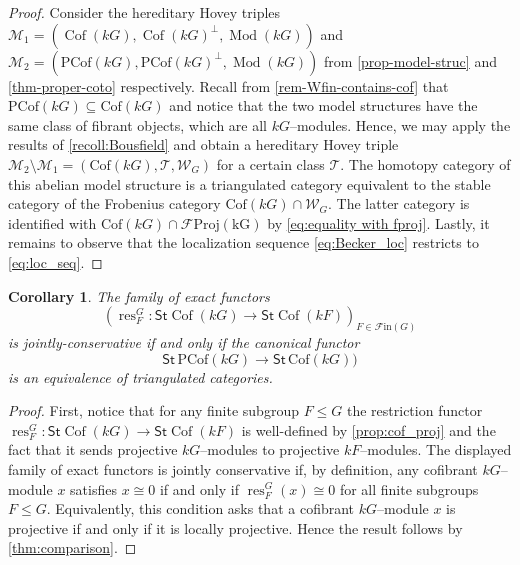 \documentclass{amsart}
\newcommand{\res}{\operatorname{res}\nolimits}
\def \Fin{{\mathcal{F}\textrm{in}}}
\def \Wfin{{\mathcal W}_{G}}
\DeclareMathOperator{\Mod}{Mod}
\DeclareMathOperator{\Cof}{Cof}
\numberwithin{equation}{section}%
\newtheorem{corollary}[equation]{Corollary}
\theoremstyle{remark}
\newtheorem{remark}[equation]{Remark}
\begin{document}
{\begin{proof}
Consider the hereditary Hovey triples $\mathcal{M}_1=(\Cof(kG),\Cof(kG)^\perp,\Mod(kG))$ and $\mathcal{M}_2=(\mathrm{PCof}(kG),\mathrm{PCof}(kG)^{\bot},\Mod(kG))$ from \cref{prop-model-struc} and  \cref{thm-proper-coto} respectively. Recall from \cref{rem-Wfin-contains-cof} that $\mathrm{PCof}(kG)\subseteq \mathrm{Cof}(kG)$ and notice that the two model structures have the same class of fibrant objects, which are all $kG$--modules. Hence, we may apply the results of  \cref{recoll:Bousfield} and obtain a hereditary Hovey triple $\mathcal{M}_2\setminus \mathcal{M}_1=(\mathrm{Cof}(kG),\mathcal{T},\Wfin)$ for a certain class $\mathcal{T}$. The homotopy category of this abelian model structure is a triangulated category equivalent to the stable category of the Frobenius category $\mathrm{Cof}(kG)\cap\Wfin$. The latter category is identified with $\mathrm{Cof}(kG)\cap\mathcal{F}\mathrm{Proj(kG)}$ by \eqref{eq:equality with fproj}. 
Lastly, it remains to observe that the localization sequence \eqref{eq:Becker_loc} restricts to  \eqref{eq:loc_seq}.
\end{proof}


\begin{corollary}\label{cor-comparison}
The  family of exact functors 
    \[
    (\res^G_F\colon \mathsf{St}\Cof(kG)\to \mathsf{St}\Cof(kF))_{F\in \Fin(G)}
    \]
    is jointly-conservative if and only if the canonical functor 
    \[
\mathsf{St}\,\mathrm{PCof}(kG)\to \mathsf{St}\,\mathrm{Cof}(kG))
    \]
    is an equivalence of triangulated categories. 
\end{corollary}

\begin{proof}
First, notice that for any finite subgroup $F\leqslant  G$ the restriction functor $\res^G_F\colon \mathsf{St}\Cof(kG)\to \mathsf{St}\Cof(kF)$ is well-defined by  \cref{prop:cof_proj} and the fact that it sends projective $kG$--modules to projective $kF$--modules. 
The displayed family of exact functors is jointly conservative if, by definition,  any cofibrant $kG$--module $x$ satisfies $x\cong 0$ if and only if $\res^G_F(x)\cong 0$ for all finite subgroups $F\leqslant G$. Equivalently, this condition asks that a cofibrant $kG$--module $x$ is projective if and only if it is locally projective. Hence the result follows by \cref{thm:comparison}.
\end{proof}

}
\end{document}
